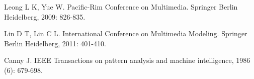 \begin{thebibliography}{99}
		Leong L K, Yue W.
		\newblock Pacific-Rim Conference on Multimedia. Springer Berlin Heidelberg, 2009: 826-835.
		
		Lin D T, Lin C L. 
		\newblock International Conference on Multimedia Modeling. Springer Berlin Heidelberg, 2011: 401-410.
		
		Canny J.  
		\newblock IEEE Transactions on pattern analysis and machine intelligence, 1986 (6): 679-698.
		
\end{thebibliography}